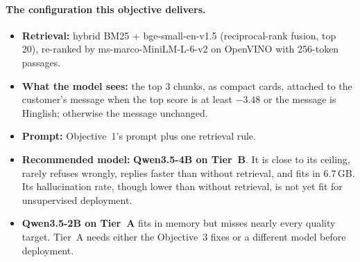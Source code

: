 \documentclass[11pt,a4paper]{article}
\begin{document}
\paragraph{The configuration this objective delivers.}
\begin{itemize}
  \item \textbf{Retrieval:} hybrid BM25 + bge-small-en-v1.5 (reciprocal-rank fusion, top 20), re-ranked by
        ms-marco-MiniLM-L-6-v2 on OpenVINO with 256-token passages.
  \item \textbf{What the model sees:} the top 3 chunks, as compact cards, attached to the customer's message when the
        top score is at least $-3.48$ or the message is Hinglish; otherwise the message unchanged.
  \item \textbf{Prompt:} Objective~1's prompt plus one retrieval rule.
  \item \textbf{Recommended model:} \textbf{Qwen3.5-4B on Tier~B}. It is close to its ceiling, rarely refuses wrongly,
        replies faster than without retrieval, and fits in 6.7\,GB. Its hallucination rate, though lower than without
        retrieval, is not yet fit for unsupervised deployment.
  \item \textbf{Qwen3.5-2B on Tier~A} fits in memory but misses nearly every quality target. Tier~A needs either the
        Objective~3 fixes or a different model before deployment.
\end{itemize}

\end{document}
